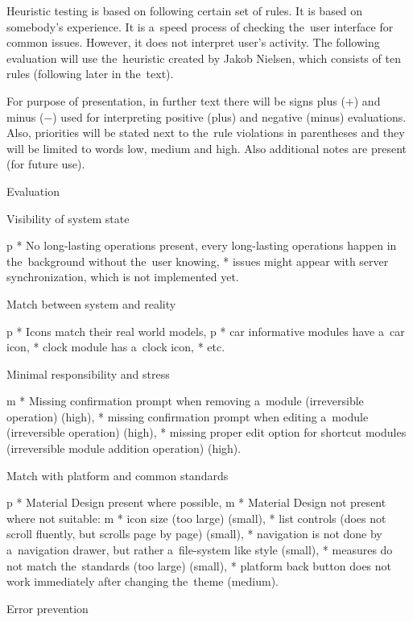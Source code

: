 Heuristic testing is based on following certain set of rules. It is based on somebody's experience. It is a~speed process of checking the~user interface for common issues. However, it does not interpret user's activity. The following evaluation will use the~heuristic created by Jakob Nielsen, which consists of ten rules (following later in the~text).

For purpose of presentation, in further text there will be signs plus ($+$) and minus ($-$) used for interpreting positive (plus) and negative (minus) evaluations. Also, priorities will be stated next to the~rule violations in parentheses and they will be limited to words low, medium and high. Also additional notes are present (for future use).

\secc Evaluation

\seccc Visibility of system state

\begitems \style p 
* No long-lasting operations present, every long-lasting operations happen in the~background without the~user knowing,
* issues might appear with server synchronization, which is not implemented yet.
\enditems

\seccc Match between system and reality

\begitems \style p
* Icons match their real world models,
  \begitems \style p
  * car informative modules have a~car icon,
  * clock module has a~clock icon,
  * etc.
  \enditems
\enditems

\seccc Minimal responsibility and stress

\begitems \style m
* Missing confirmation prompt when removing a~module (irreversible operation) (high),
* missing confirmation prompt when editing a~module (irreversible operation) (high),
* missing proper edit option for shortcut modules (irreversible module addition operation) (high).
\enditems

\seccc Match with platform and common standards

\begitems \style p
* Material Design present where possible,
\style m
* Material Design not present where not suitable:
  \begitems \style m
  * icon size (too large) (small),
  * list controls (does not scroll fluently, but scrolls page by page) (small),
  * navigation is not done by a~navigation drawer, but rather a~file-system like style (small),
  * measures do not match the~standards (too large) (small),
  * platform back button does not work immediately after changing the~theme (medium).
  \enditems
\enditems

\seccc Error prevention

